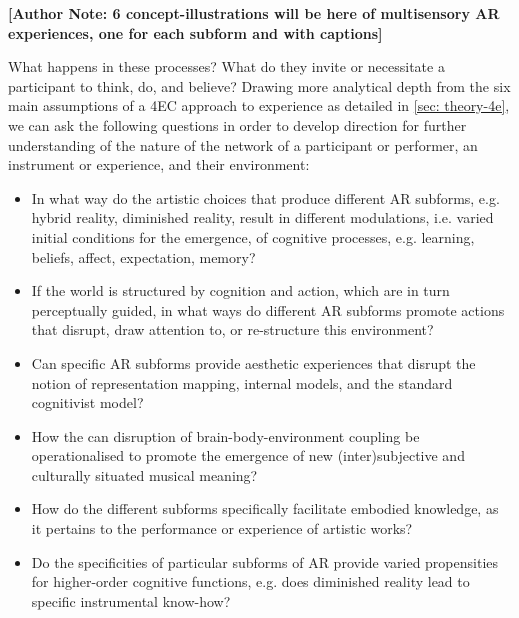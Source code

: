 \textbf{[Author Note: 6 concept-illustrations will be here of multisensory AR experiences, one for each subform and with captions]}

What happens in these processes?  What do they invite or necessitate a participant to think, do, and believe? Drawing more analytical depth from the six main assumptions of a 4EC approach to experience as detailed in \autoref{sec: theory-4e}, we can ask the following questions in order to develop direction for further understanding of the nature of the network of a participant or performer, an instrument or experience, and their environment:
	\begin{itemize}
	    \item In what way do the artistic choices that produce different AR subforms, e.g. hybrid reality, diminished reality, result in different modulations, i.e. varied initial conditions for the emergence, of cognitive processes, e.g. learning, beliefs, affect, expectation, memory?

	    \item If the world is structured by cognition and action, which are in turn perceptually guided, in what ways do different AR subforms promote actions that disrupt, draw attention to, or re-structure this environment?

	    \item Can specific AR subforms provide aesthetic experiences that disrupt the notion of representation mapping, internal models, and the standard cognitivist model?

	    \item How the can disruption of brain-body-environment coupling be operationalised to promote the emergence of new (inter)subjective and culturally situated musical meaning?

	    \item How do the different subforms specifically facilitate embodied knowledge, as it pertains to the performance or experience of artistic works?

	    \item Do the specificities of particular subforms of AR provide varied propensities for higher-order cognitive functions, e.g. does diminished reality lead to specific instrumental know-how?
	\end{itemize}

